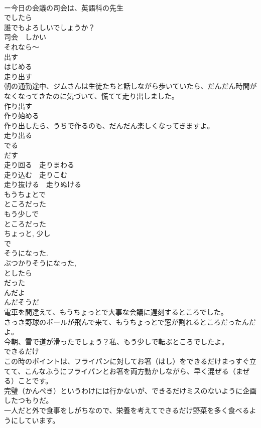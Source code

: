 \documentclass[8pt]{extreport}
\begin{document}
\begin{CJK}{UTF8}{min}
\\	ー今日の会議の司会は、英語科の先生
\\	でしたら
\\	誰でもよろしいでしょうか？
\\	司会　しかい　
\\	それなら～
\\	出す
\\	はじめる 
\\	走り出す　　
\\	朝の通勤途中、ジムさんは生徒たちと話しながら歩いていたら、だんだん時間がなくなってきたのに気づいて、慌てて走り出しました。
\\	作り出す　　
\\	作り始める
\\	作り出したら、うちで作るのも、だんだん楽しくなってきますよ。　
\\	走り出る　
\\	でる 
\\	だす
\\	走り回る　走りまわる
\\	走り込む　走りこむ
\\	走り抜ける　走りぬける
\\	もうちょとで
\\	ところだった
\\	もう少しで
\\	ところだった
\\	ちょっと, 少し 
\\	で 
\\	そうになった. 
\\	ぶつかりそうになった, 
\\	としたら 
\\	だった 
\\	んだよ 
\\	んだそうだ 
\\	電車を間違えて、もうちょっとで大事な会議に遅刻するところでした。
\\	さっき野球のボールが飛んで来て、もうちょっとで窓が割れるところだったんだよ。
\\	今朝、雪で道が滑ったでしょう？私、もう少しで転ぶところでしたよ。
\\	できるだけ
\\	この時のポイントは、フライパンに対してお箸（はし）をできるだけまっすぐ立てて、こんなふうにフライパンとお箸を両方動かしながら、早く混ぜる（まぜる）ことです。
\\	完璧（かんぺき）というわけには行かないが、できるだけミスのないように企画したつもりだ。
\\	一人だと外で食事をしがちなので、栄養を考えてできるだけ野菜を多く食べるようにしています。

\end{CJK}
\end{document}
